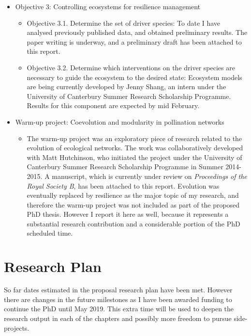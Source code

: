 \documentclass[a4paper]{article}
\begin{document}
\begin{itemize}
	\item Objective 3: Controlling ecosystems for resilience management
	\begin{itemize}
		\item Objective 3.1. Determine the set of driver species: To date I have analysed previously published data, and obtained preliminary results. The paper writing is underway, and a preliminary draft has been attached to this report. 
		\item Objective 3.2. Determine which interventions on the driver species are necessary to guide the ecosystem to the desired state: Ecosystem models are being currently developed by Jenny Shang, an intern under the University of Canterbury Summer Research Scholarship Programme. Results for this component are expected by mid February.
	\end{itemize}
	\item Warm-up project: Coevolution and modularity in pollination networks 
	\begin{itemize}
		\item The warm-up project was an exploratory piece of research related to the evolution of ecological networks. The work was collaboratively developed with Matt Hutchinson, who initiated the project under the University of Canterbury Summer Research Scholarship Programme in Summer 2014-2015. A manuscript, which is currently under review on \textit{Proceedings of the Royal Society B}, has been attached to this report. Evolution was eventually replaced by resilience as the major topic of my research, and therefore the warm-up project was not included as part of the proposed PhD thesis. However I report it here as well, because it represents a substantial research contribution and a considerable portion of the PhD scheduled time.
	\end{itemize}
	
	
\end{itemize}

\section*{Research Plan}

So far dates estimated in the proposal research plan have been met. However there are changes in the future milestones as I have been awarded funding to continue the PhD until May 2019. This extra time will be used to deepen the research output in each of the chapters and possibly more freedom to pursue side-projects. 
\end{document}
